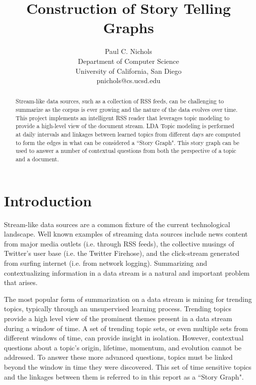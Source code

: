 \documentclass[10pt,twocolumn]{article}
\begin{document}
\begin{multicols}{2}
\title{Construction of Story Telling Graphs}
\author{
    Paul C. Nichols\\
    Department of Computer Science\\
    University of California, San Diego\\
    pnichols@cs.ucsd.edu
}
\date{}
\maketitle
\end{multicols}

\begin{abstract}
Stream-like data sources, such as a collection of RSS feeds, can be challenging to summarize as the corpus is ever growing and the nature of the data evolves over time.  This project implements an intelligent RSS reader that leverages topic modeling to provide a high-level view of the document stream.  LDA Topic modeling is performed at daily intervals and linkages between learned topics from different days are computed to form the edges in what can be considered a ``Story Graph".  This story graph can be used to answer a number of contextual questions from both the perspective of a topic and a document.
\end{abstract}

\section{Introduction}
Stream-like data sources are a common fixture of the current technological landscape.  Well known examples of streaming data sources include news content from major media outlets (i.e. through RSS feeds), the collective musings of Twitter's user base  (i.e. the Twitter Firehose), and the click-stream generated from surfing internet (i.e. from network logging).  Summarizing and contextualizing information in a data stream is a natural and important problem that arises.  

The most popular form of summarization on a data stream is mining for trending topics, typically through an unsupervised learning process. Trending topics provide a high level view of the prominent themes present in a data stream during a window of time.  A set of trending topic sets, or even multiple sets from different windows of time, can provide insight in isolation.   However, contextual questions about a topic's origin, lifetime, momentum, and evolution cannot be addressed.  To answer these more advanced questions, topics must be linked beyond the window in time they were discovered.  This set of time sensitive topics and the linkages between them is referred to in this report as a ``Story Graph".  
\end{document}
